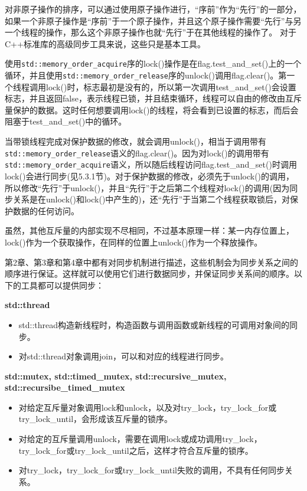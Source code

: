 
对非原子操作的排序，可以通过使用原子操作进行，“序前”作为“先行”的一部分，如果一个非原子操作是“序前”于一个原子操作，并且这个原子操作需要“先行”与另一个线程的操作，那么这个非原子操作也就“先行”于在其他线程的操作了。 对于C++标准库的高级同步工具来说，这些只是基本工具。

使用\texttt{std::memory\_order\_acquire}序的lock()操作是在flag.test\_and\_set()上的一个循环，并且使用\texttt{std::memory\_order\_release}序的unlock()调用flag.clear()。第一个线程调用lock()时，标志最初是没有的，所以第一次调用test\_and\_set()会设置标志，并且返回false，表示线程已锁，并且结束循环，线程可以自由的修改由互斥量保护的数据。这时任何想要调用lock()的线程，将会看到已设置的标志，而后会阻塞于test\_and\_set()中的循环。

当带锁线程完成对保护数据的修改，就会调用unlock()，相当于调用带有\texttt{std::memory\_order\_release}语义的flag.clear()。因为对lock()的调用带有\texttt{std::memory\_order\_acquire}语义，所以随后线程访问flag.test\_and\_set()时调用lock()会进行同步(见5.3.1节)。对于保护数据的修改，必须先于unlock()的调用，所以修改“先行”于unlock()，并且“先行”于之后第二个线程对lock()的调用(因为同步关系是在unlock()和lock()中产生的)，还“先行”于当第二个线程获取锁后，对保护数据的任何访问。

虽然，其他互斥量的内部实现不尽相同，不过基本原理一样：某一内存位置上，lock()作为一个获取操作，在同样的位置上unlock()作为一个释放操作。

第2章、第3章和第4章中都有对同步机制进行描述，这些机制会为同步关系之间的顺序进行保证。这样就可以使用它们进行数据同步，并保证同步关系间的顺序。以下的工具都可以提供同步：

\textbf{std::thread}

\begin{itemize}
    \item std::thread构造新线程时，构造函数与调用函数或新线程的可调用对象间的同步。
    \item 对std::thread对象调用join，可以和对应的线程进行同步。
\end{itemize}

\textbf{std::mutex, std::timed\_mutex, std::recursive\_mutex, std::recursibe\_timed\_mutex}

\begin{itemize}
    \item 对给定互斥量对象调用lock和unlock，以及对try\_lock，try\_lock\_for或try\_lock\_until，会形成该互斥量的锁序。
    \item 对给定的互斥量调用unlock，需要在调用lock或成功调用try\_lock，try\_lock\_for或try\_lock\_until之后，这样才符合互斥量的锁序。
    \item 对try\_lock，try\_lock\_for或try\_lock\_until失败的调用，不具有任何同步关系。
\end{itemize}

